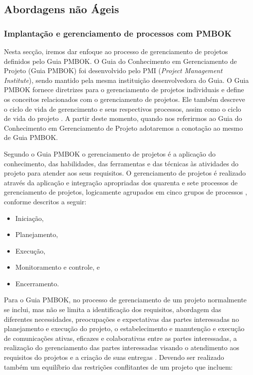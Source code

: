 \documentclass{acm_proc_article-sp}
\begin{document}
\subsection{Abordagens não Ágeis}
\subsubsection{Implantação e gerenciamento de processos com PMBOK}
Nesta secção, iremos dar enfoque ao processo de gerenciamento de projetos definidos pelo Guia PMBOK. O Guia do Conhecimento em Gerenciamento de Projeto (Guia PMBOK) foi desenvolvido pelo PMI (\textit{Project Management Institute}), sendo mantido pela mesma instituição desenvolvedora do Guia. O Guia PMBOK fornece diretrizes para o gerenciamento de projetos individuais e define os conceitos relacionados com o gerenciamento de projetos. Ele também descreve o ciclo de vida de gerencimento e seus respectivos processos, assim como o ciclo de vida do projeto \cite{pmbok:nAgil}. A partir deste momento, quando nos referirmos ao Guia do Conhecimento em Gerenciamento de Projeto adotaremos a conotação ao mesmo de Guia PMBOK.

Segundo o Guia PMBOK o gerenciamento de projetos é a aplicação do conhecimento, das habilidades, das ferramentas e das técnicas às atividades do projeto para atender aos seus requisitos. O gerenciamento de projetos é realizado através da aplicação e integração apropriadas dos quarenta e sete processos de gerenciamento de projetos, logicamente agrupados em cinco grupos de processos \cite{pmbok:nAgil}, conforme descritos a seguir:

\begin{itemize}
\item Iniciação,
\item Planejamento,
\item Execução,
\item Monitoramento e controle, e
\item Encerramento.
\end{itemize}

Para o Guia PMBOK, no processo de gerenciamento de um projeto normalmente se inclui, mas não se limita a identificação dos requisitos, abordagem das diferentes necessidades, preocupações e expectativas das partes interessadas no planejamento e execução do projeto, o estabelecimento e manutenção e execução de comunicações ativas, eficazes e colaborativas entre as partes interessadas, a realização do gerenciamento das partes interessadas  visando o atendimento aos requisitos do projetos e a criação de suas entregas \cite{pmbok:nAgil}. Devendo ser realizado também um equilíbrio das restrições conflitantes de um projeto que incluem:
\end{document}
